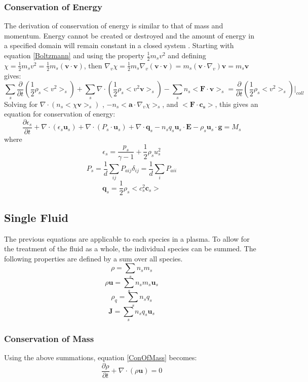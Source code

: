 \subsubsection{Conservation of Energy}
The derivation of conservation of energy is similar to that of mass and
momentum. Energy cannot be created or destroyed and the amount of energy in a
specified domain will remain constant in a closed system \citep{ConOfEner}.
Starting with equation \ref{Boltzmann} and using the property $\frac{1}{2} m_s v^2$ and defining $\chi =
\frac{1}{2}m_sv^2=\frac{1}{2}m_s(\mathbf{v} \cdot \mathbf{v})$, then $\nabla_v
\chi = \frac{1}{2} m_s\nabla_v( \mathbf{v} \cdot \mathbf{v}) =
m_s(\mathbf{v}\cdot \nabla_v)\mathbf{v} = m_s\mathbf{v}$ gives:
\begin{equation}
\sum_s \frac{\partial}{\partial t} (\frac{1}{2}\rho_s < v^2 >_s) + \sum_s \nabla
\cdot (\frac{1}{2}\rho_s <v^2 \mathbf{v} >_s) - \sum_s n_s < \mathbf{F} \cdot
\mathbf{v} >_s = \frac{\partial}{\partial t}(\frac{1}{2} \rho_s < v^2
>_s)\bigg|_{coll}
\end{equation}
Solving for $\nabla \cdot (n_s < \chi \mathbf{v} >_s)$ , $- n_s < \mathbf{a}
\cdot \nabla_v \chi >_s$, and $< \mathbf{F} \cdot \mathbf{c_s} >$, this gives
an equation for conservation of energy:
\begin{equation}
\frac{\partial \epsilon_s}{\partial t} + \nabla \cdot (\epsilon_s \mathbf{u}_s)
+ \nabla \cdot (P_s \cdot \mathbf{u}_s) + \nabla \cdot \mathbf{q}_s -
n_sq_s\mathbf{u}_s \cdot \mathbf{E} - \rho_s\mathbf{u}_s \cdot \mathbf{g} = M_s
\label{ConOfEner}
\end{equation}
where $$\epsilon_s = \frac{p_s}{\gamma - 1} + \frac{1}{2} \rho_s u^2_s $$
$$P_s = \frac{1}{d} \sum_{ij} P_{aij}\delta_{ij} = \frac{1}{d}\sum_i P_{aii}$$
 $$\mathbf{q}_s = \frac{1}{2}\rho_s <c^2_s \mathbf{c}_s >$$
\subsection{Single Fluid}
The previous equations are applicable to each species in a plasma. To
allow for the treatment of the fluid as a whole, the individual species can be
summed. The following properties are defined by a sum over all species.
$$ \rho = \sum_s n_s m_s $$
$$ \rho \mathbf{u} = \sum_s n_s m_s \mathbf{u}_s $$
$$ \rho_q = \sum_s n_s q_s $$
$$ \mathbf{J} = \sum_s n_s q_s \mathbf{u}_s $$
\subsubsection{Conservation of Mass}
Using the above summations, equation \ref{ConOfMass} becomes:
\begin{equation}
\frac{\partial\rho}{\partial t} + \nabla \cdot (\rho \mathbf{u}) = 0
\label{FluidConOfMass}
\end{equation} 
